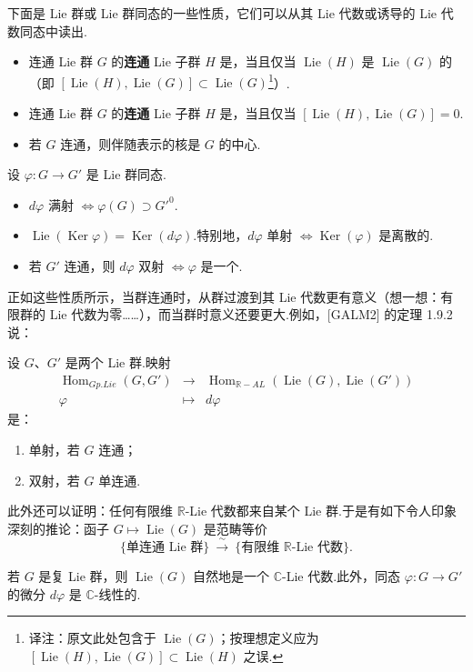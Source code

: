 \begin{numpara}\label{np:ssl-1-3-5}
下面是 Lie 群或 Lie 群同态的一些性质，它们可以从其 Lie 代数或诱导的 Lie 代数同态中读出.
\begin{itemize}
\item 连通 Lie 群 $G$ 的\textbf{连通} Lie 子群 $H$ 是，当且仅当 $\operatorname{Lie}(H)$ 是 $\operatorname{Lie}(G)$ 的（即 $[\operatorname{Lie}(H),\operatorname{Lie}(G)]\subset\operatorname{Lie}(G)$\footnote{译注：原文此处包含于 $\operatorname{Lie}(G)$；按理想定义应为 $[\operatorname{Lie}(H),\operatorname{Lie}(G)]\subset\operatorname{Lie}(H)$ 之误.}）.
\item 连通 Lie 群 $G$ 的\textbf{连通} Lie 子群 $H$ 是，当且仅当 $[\operatorname{Lie}(H),\operatorname{Lie}(G)]=0$.
\item 若 $G$ 连通，则伴随表示的核是 $G$ 的中心.
\end{itemize}
设 $\varphi\colon G\longrightarrow G'$ 是 Lie 群同态.
\begin{itemize}
\item $d\varphi$ 满射 $\iff\varphi(G)\supset G'^{0}$.
\item $\operatorname{Lie}(\operatorname{Ker}\varphi)=\operatorname{Ker}(d\varphi)$.特别地，$d\varphi$ 单射 $\iff\operatorname{Ker}(\varphi)$ 是离散的.
\item 若 $G'$ 连通，则 $d\varphi$ 双射 $\iff\varphi$ 是一个.
\end{itemize}
正如这些性质所示，当群连通时，从群过渡到其 Lie 代数更有意义（想一想：有限群的 Lie 代数为零……），而当群时意义还要更大.例如，[GALM2] 的定理 1.9.2 说：

\begin{theorem*}
设 $G$、$G'$ 是两个 Lie 群.映射
\[
\begin{array}{rcl}
\operatorname{Hom}_{Gp.Lie}(G,G') &\longrightarrow& \operatorname{Hom}_{\mathbb{R}-AL}(\operatorname{Lie}(G),\operatorname{Lie}(G'))\\
\varphi &\longmapsto& d\varphi
\end{array}
\]
是：
\begin{enumerate}[label=\roman*)]
\item 单射，若 $G$ 连通；
\item 双射，若 $G$ 单连通.
\end{enumerate}
\end{theorem*}

此外还可以证明：任何有限维 $\mathbb{R}$-Lie 代数都来自某个 Lie 群.于是有如下令人印象深刻的推论：函子 $G\mapsto\operatorname{Lie}(G)$ 是范畴等价
\[
\{\text{单连通 Lie 群}\}\ \xrightarrow{\ \sim\ }\ \{\text{有限维 }\mathbb{R}\text{-Lie 代数}\}.
\]
\end{numpara}

\begin{numpara}[复情形]\label{np:ssl-1-3-6}
若 $G$ 是复 Lie 群，则 $\operatorname{Lie}(G)$ 自然地是一个 $\mathbb{C}$-Lie 代数.此外，同态 $\varphi\colon G\longrightarrow G'$ 的微分 $d\varphi$ 是 $\mathbb{C}$-线性的.
\end{numpara}
